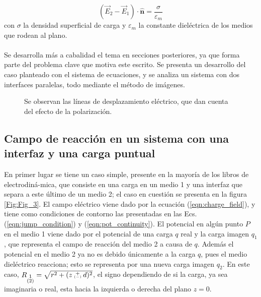 \documentclass[12pt, twoside, onehalfspace, numbers, spanish]{ezthesis}
\numberwithin{equation}{section}
\newcommand\varpm{\mathbin{\vcenter{\hbox{\oalign{\hfil$\scriptstyle+$\hfil\cr\noalign{\kern-.3ex}$\scriptscriptstyle({-})$\cr}}}}}
\begin{document}
\begin{equation}
(\vec{E}_2 - \vec{E}_1)\cdot\hat{\mathbf{n}} = \frac{\sigma}{\varepsilon_m}
\end{equation}
con $\sigma$ la densidad superficial de carga y $\varepsilon_m$ la constante dieléctrica de los medios que rodean al plano. \\\\
Se desarrolla más a cabalidad el tema en secciones posteriores, ya que forma parte del problema clave que motiva este escrito. Se presenta un desarrollo del caso planteado con el sistema de ecuaciones, y se analiza un sistema con dos interfaces paralelas, todo mediante el método de imágenes. 
\begin{figure}[h]
	\centering
	
	\caption{Se observan las líneas de desplazamiento eléctrico, que dan cuenta del efecto de la polarización.}\label{Fig:Fig_2}
\end{figure}
\noindent
\subsection{Campo de reacción en un sistema con una interfaz y una carga puntual}\label{subsec:Reaction_Field}
En primer lugar se tiene un caso simple, presente en la mayoría de los libros de electrodiná-mica, que consiste en una carga en un medio 1 y una interfaz que separa a este último de un medio 2; el caso en cuestión se presenta en la figura \ref{Fig:Fig_3}. El campo eléctrico viene dado por la ecuación (\ref{eqn:charge_field}), y tiene como condiciones de contorno las presentadas en las Ecs. (\ref{eqn:jump_condition}) y (\ref{eqn:pot_continuity}).
El potencial en algún punto $P$ en el medio 1 viene dado por el potencial de una carga $q$ real y la carga imagen $q_1$, que representa el campo de reacción del medio 2 a causa de $q$. Además el potencial en el medio 2 ya no es debido únicamente a la carga $q$, pues el medio dieléctrico reacciona; esto se representa por una nueva carga imagen $q_2$. En este caso, $R_{\substack{1\\(2)}} = \sqrt{r^2 + (z \varpm d)^2}$, el signo dependiendo de si la carga, ya sea imaginaria o real, esta hacia la izquierda o derecha del plano $z=0$.
\end{document}
